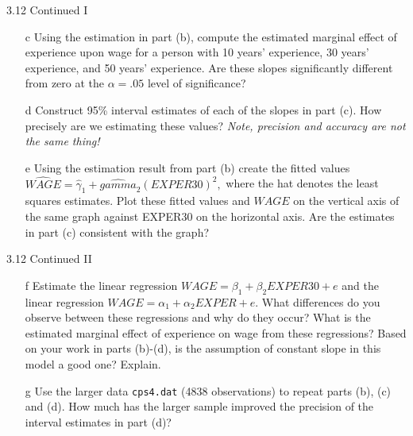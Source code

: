 \documentclass[xcolor={dvipsnames}]{beamer}
\begin{document}
\begin{frame}{3.12 Continued I}

\begin{itemize}[<+->]
	\item[c] Using the estimation in part (b), compute the estimated marginal effect of experience upon wage for a person with 10 years' experience, 30 years' experience, and 50 years' experience. Are these slopes significantly different from zero at the $\alpha = .05$ level of significance?
	
	\item[d] Construct 95\% interval estimates of each of the slopes in part (c). How precisely are we estimating these values? \textit{Note, precision and accuracy are not the same thing!}
	
	\item[e] Using the estimation result from part (b) create the fitted values $\hat{WAGE} = \hat{\gamma}_1 + \hat{gamma}_2 (EXPER30)^2,$ where the hat denotes the least squares estimates. Plot these fitted values and $WAGE$ on the vertical axis of the same graph against EXPER30 on the horizontal axis. Are the estimates in part (c) consistent with the graph?
	
	
\end{itemize}

\end{frame}


\begin{frame}{3.12 Continued II}

\begin{itemize}[<+->]
	
	\item[f] Estimate the linear regression $WAGE = \beta_1 + \beta_2EXPER30 + e$ and the linear regression $WAGE = \alpha_1 + \alpha_2 EXPER + e$. What differences do you observe between these regressions and why do they occur? What is the estimated marginal effect of experience on wage from these regressions? Based on your work in parts (b)-(d), is the assumption of constant slope in this model a good one? Explain.
	
	\item[g] Use the larger data \texttt{cps4.dat} (4838 observations) to repeat parts (b), (c) and (d). How much has the larger sample improved the precision of the interval estimates in part (d)?
\end{itemize}

\end{frame}
\end{document}
